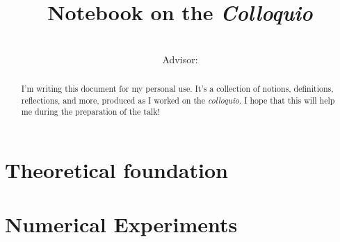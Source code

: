 \documentclass{article}
\title{
  {\Huge Notebook on the \textit{Colloquio}} \\
  \colloquioTitle
}
\author{
  \myFullName \\
  {\small Advisor: \advisorFullName}
}
\date{\colloquioDate}
\begin{document}
  \maketitle
  \begin{abstract}
    I'm writing this document for my personal use. It's a collection of notions,
    definitions, reflections, and more, produced as I worked on the \textit{colloquio}.
    I hope that this will help me during the preparation of the talk!
  \end{abstract}
  \tableofcontents
  \clearpage
  
  \part{Theoretical foundation}
  
  
  
  
  \clearpage
  \part{Numerical Experiments}
  
    
  \clearpage
  \printbibliography
\end{document}
